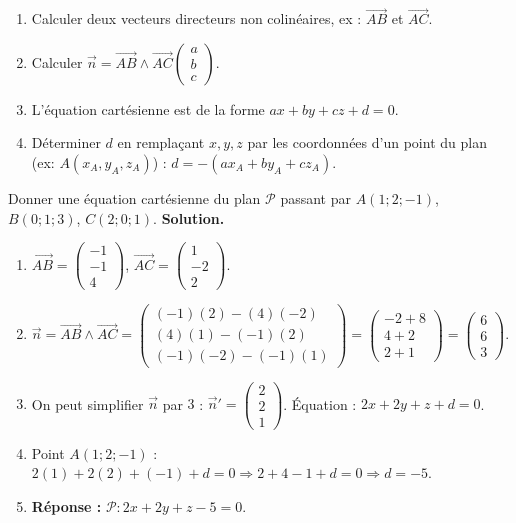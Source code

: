 \documentclass[11pt]{article}
\begin{document}
\begin{methode}[Équation cartésienne d'un plan $\mathcal{P}=(ABC)$]
\begin{enumerate}
  \item Calculer deux vecteurs directeurs non colinéaires, ex : $\overrightarrow{AB}$ et $\overrightarrow{AC}$.
  \item Calculer $\vec{n} = \overrightarrow{AB}\wedge\overrightarrow{AC} \begin{pmatrix}a\\b\\c\end{pmatrix}$.
  \item L'équation cartésienne est de la forme $ax+by+cz+d=0$.
  \item Déterminer $d$ en remplaçant $x,y,z$ par les coordonnées d'un point du plan (ex: $A(x_A,y_A,z_A)$) : $d = -(ax_A+by_A+cz_A)$.
\end{enumerate}
\end{methode}

\begin{exoresolu}
Donner une équation cartésienne du plan $\mathcal{P}$ passant par $A(1;2;-1)$, $B(0;1;3)$, $C(2;0;1)$.
\tcblower
\textbf{Solution.}
\begin{enumerate}
  \item $\overrightarrow{AB}=\begin{pmatrix}-1\\-1\\4\end{pmatrix}$, $\overrightarrow{AC}=\begin{pmatrix}1\\-2\\2\end{pmatrix}$.
  \item $\vec{n} = \overrightarrow{AB}\wedge\overrightarrow{AC} = \begin{pmatrix} (-1)(2) - (4)(-2) \\ (4)(1) - (-1)(2) \\ (-1)(-2) - (-1)(1) \end{pmatrix} = \begin{pmatrix} -2+8 \\ 4+2 \\ 2+1 \end{pmatrix} = \begin{pmatrix}6\\6\\3\end{pmatrix}$.
  \item On peut simplifier $\vec{n}$ par $3$ : $\vec{n}'=\begin{pmatrix}2\\2\\1\end{pmatrix}$. Équation : $2x+2y+z+d=0$.
  \item Point $A(1;2;-1)$ : $2(1)+2(2)+(-1)+d=0 \Rightarrow 2+4-1+d=0 \Rightarrow d=-5$.
  \item \textbf{Réponse :} $\mathcal{P} : 2x+2y+z-5=0$.
\end{enumerate}
\end{exoresolu}
\end{document}

